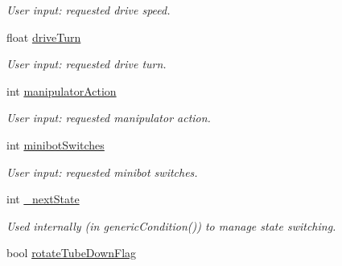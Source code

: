 \begin{DoxyCompactItemize}
\begin{DoxyCompactList}\small\item\em User input: requested drive speed. \item\end{DoxyCompactList}\item 
\hypertarget{class_r_j_f_r_c2011_1_1_teleoperated_ad2a716aacf9ab3d2379c0255bb193638}{
float \hyperlink{class_r_j_f_r_c2011_1_1_teleoperated_ad2a716aacf9ab3d2379c0255bb193638}{driveTurn}}
\label{class_r_j_f_r_c2011_1_1_teleoperated_ad2a716aacf9ab3d2379c0255bb193638}

\begin{DoxyCompactList}\small\item\em User input: requested drive turn. \item\end{DoxyCompactList}\item 
\hypertarget{class_r_j_f_r_c2011_1_1_teleoperated_a84e0dd4584d3c97475a0dde1242d485f}{
int \hyperlink{class_r_j_f_r_c2011_1_1_teleoperated_a84e0dd4584d3c97475a0dde1242d485f}{manipulatorAction}}
\label{class_r_j_f_r_c2011_1_1_teleoperated_a84e0dd4584d3c97475a0dde1242d485f}

\begin{DoxyCompactList}\small\item\em User input: requested manipulator action. \item\end{DoxyCompactList}\item 
\hypertarget{class_r_j_f_r_c2011_1_1_teleoperated_ae1d4ce201074832575f6a5dbe34a7c78}{
int \hyperlink{class_r_j_f_r_c2011_1_1_teleoperated_ae1d4ce201074832575f6a5dbe34a7c78}{minibotSwitches}}
\label{class_r_j_f_r_c2011_1_1_teleoperated_ae1d4ce201074832575f6a5dbe34a7c78}

\begin{DoxyCompactList}\small\item\em User input: requested minibot switches. \item\end{DoxyCompactList}\item 
\hypertarget{class_r_j_f_r_c2011_1_1_teleoperated_a8a3025d8bc20673eb7db70db765fa1ff}{
int \hyperlink{class_r_j_f_r_c2011_1_1_teleoperated_a8a3025d8bc20673eb7db70db765fa1ff}{\_\-nextState}}
\label{class_r_j_f_r_c2011_1_1_teleoperated_a8a3025d8bc20673eb7db70db765fa1ff}

\begin{DoxyCompactList}\small\item\em Used internally (in {\itshape genericCondition()\/}) to manage state switching. \item\end{DoxyCompactList}\item 
\hypertarget{class_r_j_f_r_c2011_1_1_teleoperated_a68b5dd3cb2442b6b722de3aa75e9dfee}{
bool \hyperlink{class_r_j_f_r_c2011_1_1_teleoperated_a68b5dd3cb2442b6b722de3aa75e9dfee}{rotateTubeDownFlag}}
\label{class_r_j_f_r_c2011_1_1_teleoperated_a68b5dd3cb2442b6b722de3aa75e9dfee}


\end{DoxyCompactItemize}
